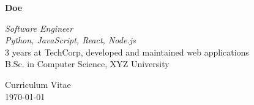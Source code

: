 \documentclass[12pt]{article}
\begin{document}
\noindent
\hfill
\begin{minipage}[t]{14cm}
\large
{\bf\John Doe}\\[2ex]
\end{minipage}
\hfill
\begin{minipage}[t]{8cm}
\large
{\it Software Engineer}\\
{\it Python, JavaScript, React, Node.js}\\
3 years at TechCorp, developed and maintained web applications\\
B.Sc. in Computer Science, XYZ University\\[2ex]
\end{minipage}

\vfill
\hfill
\begin{minipage}[t]{10cm}
Curriculum Vitae \\
\today \\
\end{minipage}
\end{document}
